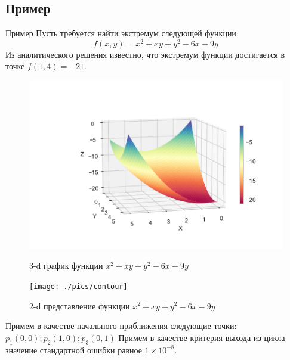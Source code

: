 \documentclass[aspectratio=169, mathserif]{beamer}	%
\begin{document}
\subsection{Пример}
\begin{frame}[fragile]{Пример}
\scriptsize
Пусть требуется найти экстремум следующей функции:
$$
f\left(x, y\right) = x^2 + xy + y^2 - 6x - 9y
$$
Из аналитического решения известно, что экстремум функции достигается в точке $f\left(1,4\right)=-21$.
\begin{figure}[h!]
	\centering
	\begin{minipage}{.45\textwidth}
		\includegraphics[width=\linewidth]{./pics/3dplot}
		\caption{3-d график функции $x^2 + xy + y^2 - 6x - 9y$}
		\label{fig:3d}
	\end{minipage}
	\begin{minipage}{.65\textheight}
		\texttt{[image: ./pics/contour]}
		\caption{2-d представление функции $x^2 + xy + y^2 - 6x - 9y$}
		\label{fig:contour}
	\end{minipage}
\end{figure}
Примем в качестве начального приближения следующие точки:
$
p_1\left(0,0\right); p_2\left(1,0\right); p_3\left(0, 1\right)
$
Примем в качестве критерия выхода из цикла значение стандартной ошибки равное $1\times 10^{-8}$.
\vfill
\end{frame}
\end{document}
